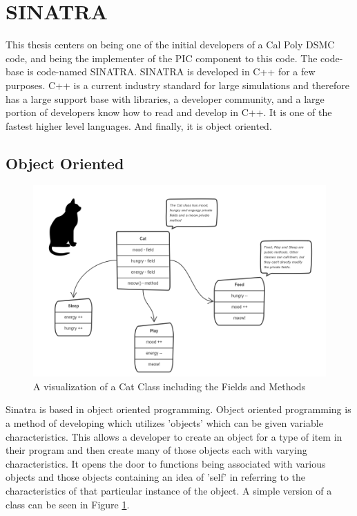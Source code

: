 \section{SINATRA}

This thesis centers on being one of the initial developers of a Cal Poly DSMC code, and being the implementer of the PIC component to this code. The code-base is code-named SINATRA. SINATRA is developed in C++ for a few purposes. C++ is a current industry standard for large simulations and therefore has a large support base with libraries, a developer community, and a large portion of developers know how to read and develop in C++. It is one of the fastest higher level languages. And finally, it is object oriented. 

\subsection{Object Oriented}

\begin{figure}
    \centering
    \includegraphics[width=.75\textwidth]{figures/classes.png}
    \caption{A visualization of a Cat Class including the Fields and Methods  \cite{classes}}
    \label{fig:classes}
\end{figure}

Sinatra is based in object oriented programming. Object oriented programming is a method of developing which utilizes 'objects' which can be given variable characteristics. This allows a developer to create an object for a type of item in their program and then create many of those objects each with varying characteristics. It opens the door to functions being associated with various objects and those objects containing an idea of 'self' in referring to the characteristics of that particular instance of the object. A simple version of a class can be seen in Figure \ref{fig:classes}. \par


